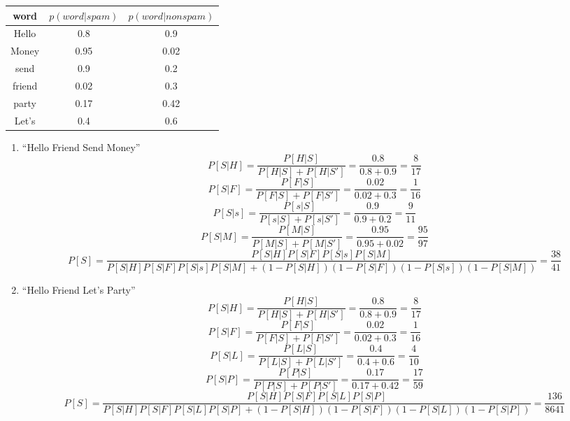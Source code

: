 \documentclass[10.5pt,letterpaper]{article}
\begin{document}
\begin{enumerate}[label=\textbf{Problem \arabic*.}]
\begin{center}
\begin{tabular}{ |c|c|c| }
\hline 
\textbf{word} & $p(word|spam)$ & $p(word|nonspam)$ \\
\hline
Hello & 0.8 & 0.9 \\
\hline
Money & 0.95 & 0.02 \\
\hline
send & 0.9 & 0.2 \\
\hline
friend & 0.02 & 0.3 \\
\hline
party & 0.17 & 0.42 \\
\hline
Let's & 0.4 & 0.6 \\
\hline
\end{tabular}
\end{center}
	\begin{enumerate}[label=\alph*)]
	\item ``Hello Friend Send Money''
	\[P[S|H]=\frac{P[H|S]}{P[H|S]+P[H|S']}=\frac{0.8}{0.8+0.9}=\frac{8}{17}\]
	\[P[S|F]=\frac{P[F|S]}{P[F|S]+P[F|S']}=\frac{0.02}{0.02+0.3}=\frac{1}{16}\]
	\[P[S|s]=\frac{P[s|S]}{P[s|S]+P[s|S']}=\frac{0.9}{0.9+0.2}=\frac{9}{11}\]
	\[P[S|M]=\frac{P[M|S]}{P[M|S]+P[M|S']}=\frac{0.95}{0.95+0.02}=\frac{95}{97}\]
	\[P[S]=\frac{P[S|H]P[S|F]P[S|s]P[S|M]}{P[S|H]P[S|F]P[S|s]P[S|M]+(1-P[S|H])(1-P[S|F])(1-P[S|s])(1-P[S|M])}=\frac{38}{41}\]
	\item ``Hello Friend Let's Party''
	\[P[S|H]=\frac{P[H|S]}{P[H|S]+P[H|S']}=\frac{0.8}{0.8+0.9}=\frac{8}{17}\]
	\[P[S|F]=\frac{P[F|S]}{P[F|S]+P[F|S']}=\frac{0.02}{0.02+0.3}=\frac{1}{16}\]
	\[P[S|L]=\frac{P[L|S]}{P[L|S]+P[L|S']}=\frac{0.4}{0.4+0.6}=\frac{4}{10}\]
	\[P[S|P]=\frac{P[P|S]}{P[P|S]+P[P|S']}=\frac{0.17}{0.17+0.42}=\frac{17}{59}\]
	\[P[S]=\frac{P[S|H]P[S|F]P[S|L]P[S|P]}{P[S|H]P[S|F]P[S|L]P[S|P]+(1-P[S|H])(1-P[S|F])(1-P[S|L])(1-P[S|P])}=\frac{136}{8641}\]
	\end{enumerate}
\end{enumerate}
\pagebreak

\end{document}
